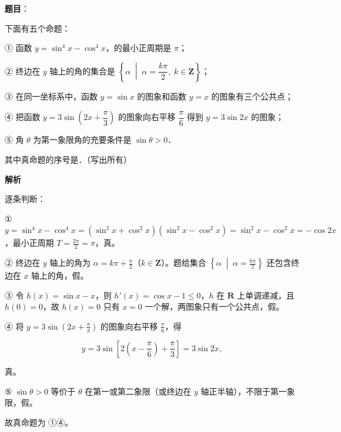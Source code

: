 \begin{answer}

\textbf{题目}：

下面有五个命题：

① 函数 $y=\sin^4x-\cos^4x$，的最小正周期是 $\pi$；

② 终边在 $y$ 轴上的角的集合是 $\left\{\alpha\;\middle|\;\alpha=\dfrac{k\pi}{2},\;k\in\mathbf Z\right\}$；

③ 在同一坐标系中，函数 $y=\sin x$ 的图象和函数 $y=x$ 的图象有三个公共点；

④ 把函数 $y=3\sin\left(2x+\dfrac{\pi}{3}\right)$ 的图象向右平移 $\dfrac{\pi}{6}$ 得到 $y=3\sin2x$ 的图象；

⑤ 角 $\theta$ 为第一象限角的充要条件是 $\sin\theta>0$．

其中真命题的序号是\gkblank{}．（写出所有）

\textbf{解析}

逐条判断：

① $y=\sin^4x-\cos^4x=(\sin^2x+\cos^2x)(\sin^2x-\cos^2x)=\sin^2x-\cos^2x=-\cos2x$，最小正周期 $T=\frac{2\pi}{2}=\pi$，真。

② 终边在 $y$ 轴上的角为 $\alpha=k\pi+\frac{\pi}{2}$（$k\in\mathbf Z$）。题给集合 $\left\{\alpha\;\middle|\;\alpha=\frac{k\pi}{2}\right\}$ 还包含终边在 $x$ 轴上的角，假。

③ 令 $h(x)=\sin x-x$，则 $h'(x)=\cos x-1\leqslant0$，$h$ 在 $\mathbf R$ 上单调递减，且 $h(0)=0$，故 $h(x)=0$ 只有 $x=0$ 一个解，两图象只有一个公共点，假。

④ 将 $y=3\sin\left(2x+\frac{\pi}{3}\right)$ 的图象向右平移 $\frac{\pi}{6}$，得

\nopagebreak[4]
\[y=3\sin\left[2\left(x-\frac{\pi}{6}\right)+\frac{\pi}{3}\right]=3\sin2x,\]

真。

⑤ $\sin\theta>0$ 等价于 $\theta$ 在第一或第二象限（或终边在 $y$ 轴正半轴），不限于第一象限，假。

故真命题为 ①④。


\end{answer}
